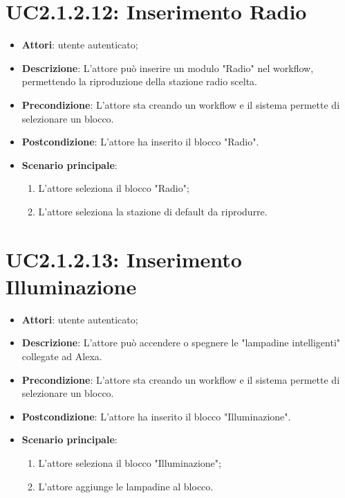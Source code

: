 \section{UC2.1.2.12: Inserimento Radio}
\label{UC2.1.2.12}
\begin{itemize}
	\item \textbf{Attori}: utente autenticato;
	\item \textbf{Descrizione}: L'attore può inserire un modulo "Radio" nel workflow, permettendo la riproduzione della stazione radio scelta.
	\item \textbf{Precondizione}: L'attore sta creando un workflow e il sistema permette di selezionare un blocco.
	\item \textbf{Postcondizione}: L'attore ha inserito il blocco "Radio".
	\item \textbf{Scenario principale}:
	\begin{enumerate} \item L'attore seleziona il blocco "Radio";  \item  L'attore seleziona la stazione di default da riprodurre.\end{enumerate}
\end{itemize}

\section{UC2.1.2.13: Inserimento Illuminazione}
\label{UC2.1.2.13}
\begin{itemize}
	\item \textbf{Attori}: utente autenticato;
	\item \textbf{Descrizione}: L'attore può accendere o spegnere le "lampadine intelligenti" collegate ad Alexa.
	\item \textbf{Precondizione}: L'attore sta creando un workflow e il sistema permette di selezionare un blocco.
	\item \textbf{Postcondizione}: L'attore ha inserito il blocco "Illuminazione".
	\item \textbf{Scenario principale}:
	\begin{enumerate} \item L'attore seleziona il blocco "Illuminazione";  \item  L'attore aggiunge le lampadine al blocco.\end{enumerate}
\end{itemize}

